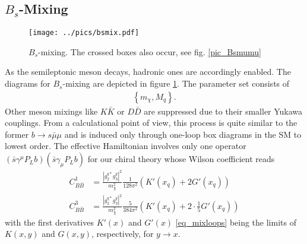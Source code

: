 \subsection{$B_s$-Mixing}
\begin{figure}[t]
 \texttt{[image: ../pics/bsmix.pdf]}
 \caption{$B_s$-mixing. The crossed boxes also occur, see fig. \ref{pic_Bsmumu}}
 \label{pic_Bsmix}
\end{figure}
As the semileptonic meson decays, hadronic ones are accordingly enabled. The diagrams for $B_s$-mixing are depicted in figure \ref{pic_Bsmix}. 
The parameter set consists of
\begin{align}
 \left\{m_\chi,M_q\right\}.
\end{align}
Other
meson mixings like $K\bar K$ or $ D \bar D$ are suppressed due to their smaller Yukawa couplings. From a calculational point of view, this process is 
quite similar to the former $b\rightarrow s\bar\mu\mu$ and is induced only through one-loop box diagrams in the SM to lowest order. The effective Hamiltonian
involves only one operator $(\bar s \gamma^\mu P_L b)(\bar s \gamma_\mu P_L b)$ for our chiral theory whose Wilson coefficient reads
\begin{align}
 C_{B\bar B}^1 &=  \frac{|g_2^{q*}g_3^q|^2}{m_\chi^2} \frac{1}{128\pi^2} \left(K'(x_q) + 2 G'(x_q)\right)\label{eq_WilsonMix1}\\
 C_{B\bar B}^3 &=  \frac{|g_2^{q*}g_3^q|^2}{m_\chi^2} \frac{5}{384\pi^2} \left(K'(x_q) + 2\cdot\frac15 G'(x_q)\right)
 \label{eq_WilsonMix3}
\end{align}
with the first derivatives $K'(x)$ and $G'(x)$ \eqref{eq_mixloops} being the limits of $K(x,y)$ and $G(x,y)$, respectively, for $y\rightarrow x$. 

